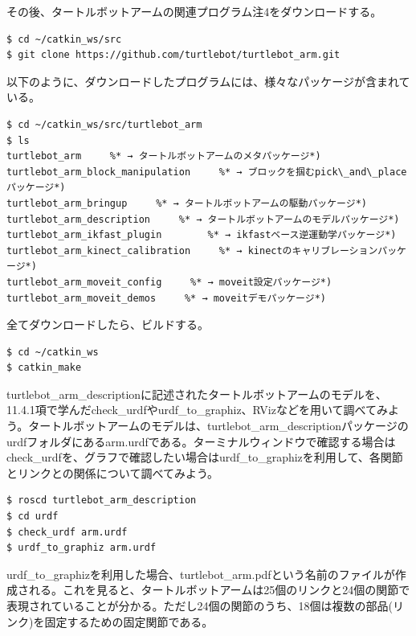 その後、タートルボットアームの関連プログラム注4をダウンロードする。

\begin{lstlisting}[language=ROS]
$ cd ~/catkin_ws/src
$ git clone https://github.com/turtlebot/turtlebot_arm.git
\end{lstlisting}

以下のように、ダウンロードしたプログラムには、様々なパッケージが含まれている。

\begin{lstlisting}[language=ROS]
$ cd ~/catkin_ws/src/turtlebot_arm
$ ls
turtlebot_arm     %* → タートルボットアームのメタパッケージ*)
turtlebot_arm_block_manipulation     %* → ブロックを掴むpick\_and\_placeパッケージ*)
turtlebot_arm_bringup     %* → タートルボットアームの駆動パッケージ*)
turtlebot_arm_description     %* → タートルボットアームのモデルパッケージ*)
turtlebot_arm_ikfast_plugin        %* → ikfastベース逆運動学パッケージ*)
turtlebot_arm_kinect_calibration     %* → kinectのキャリブレーションパッケージ*)
turtlebot_arm_moveit_config     %* → moveit設定パッケージ*)
turtlebot_arm_moveit_demos     %* → moveitデモパッケージ*)
\end{lstlisting}

全てダウンロードしたら、ビルドする。

\begin{lstlisting}[language=ROS]
$ cd ~/catkin_ws
$ catkin_make
\end{lstlisting}

turtlebot\_arm\_descriptionに記述されたタートルボットアームのモデルを、11.4.1項で学んだcheck\_urdfやurdf\_to\_graphiz、RVizなどを用いて調べてみよう。タートルボットアームのモデルは、turtlebot\_arm\_descriptionパッケージのurdfフォルダにあるarm.urdfである。ターミナルウィンドウで確認する場合はcheck\_urdfを、グラフで確認したい場合はurdf\_to\_graphizを利用して、各関節とリンクとの関係について調べてみよう。

\begin{lstlisting}[language=ROS]
$ roscd turtlebot_arm_description
$ cd urdf
$ check_urdf arm.urdf
$ urdf_to_graphiz arm.urdf
\end{lstlisting}

urdf\_to\_graphizを利用した場合、turtlebot\_arm.pdfという名前のファイルが作成される。これを見ると、タートルボットアームは25個のリンクと24個の関節で表現されていることが分かる。ただし24個の関節のうち、18個は複数の部品(リンク)を固定するための固定関節である。

